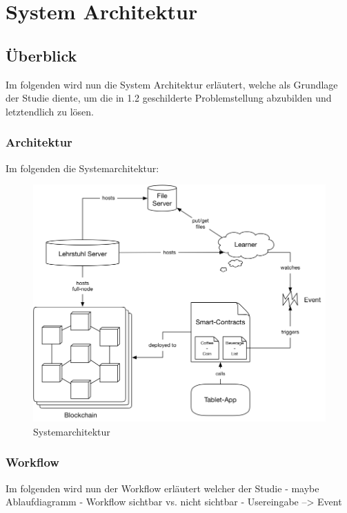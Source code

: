 \chapter{System Architektur}
\label{kap:Kapitel03}

\section{Überblick}

Im folgenden wird nun die System Architektur erläutert, welche als Grundlage der Studie diente, um die in 1.2 geschilderte Problemstellung abzubilden und letztendlich zu lösen. 

\subsection{Architektur}
Im folgenden die Systemarchitektur:

\begin{figure}[th!]
	\centering
	\includegraphics[width=.99\columnwidth]{./Abbildungen/Kapitel_03/system_architecture.png}
	\caption{Systemarchitektur}
	\label{img:abb1}
\end{figure}

\subsection{Workflow}
Im folgenden wird nun der Workflow erläutert welcher der Studie  
- maybe Ablaufdiagramm 
- Workflow sichtbar vs. nicht sichtbar
- Usereingabe --> Event 
